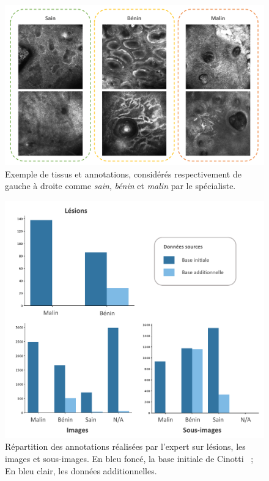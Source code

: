 \begin{figure}[H]
    \begin{center}
        \includegraphics[width=0.9\linewidth]{contents/ii_preamble_microscopy/resources/example_rcm_data.pdf}
        \caption{Exemple de tissus et annotations, considérés respectivement de gauche à droite comme \textit{sain}, \textit{bénin} et \textit{malin} par le spécialiste.}
        \label{fig:example_rcm_data}
    \end{center} 
\end{figure}\par

\begin{figure}[H]
    \begin{center}
        \includegraphics[width=0.8\linewidth]{contents/ii_preamble_microscopy/resources/scheme_rcm_statistics.pdf}
        \caption{Répartition des annotations réalisées par l'expert sur lésions, les images et sous-images. En bleu foncé, la base initiale de Cinotti~\cite{Cinotti2018} ; En bleu clair, les données additionnelles.}
        \label{fig:scheme_rcm_statistics}
    \end{center} 
\end{figure}\par

